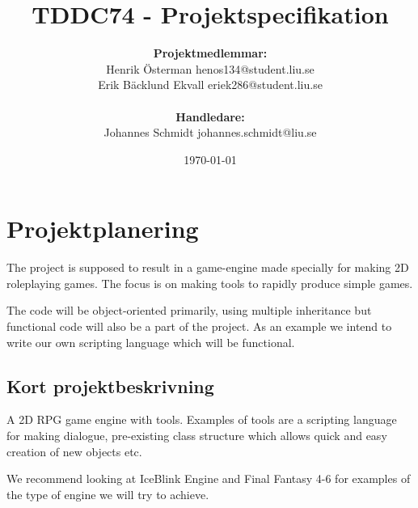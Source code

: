 \documentclass[12pt,a4paper]{article}
\title{TDDC74 -  Projektspecifikation}
\author{\textbf{Projektmedlemmar:}\\
Henrik Österman \small{henos134@student.liu.se}\\
Erik Bäcklund Ekvall \small{eriek286@student.liu.se}\\ 
\bigskip\\ \textbf{Handledare:}\\
Johannes Schmidt {\small johannes.schmidt@liu.se}}
\date{\today}
\begin{document}
\maketitle
\newpage

\tableofcontents
\newpage

\section{Projektplanering}

The project is supposed to result in a game-engine made specially for making 2D roleplaying games. 
The focus is on making tools to rapidly produce simple games.

The code will be object-oriented primarily, using multiple inheritance but functional code will also be a part of the project. As an example we intend to write our own scripting language which will be functional.


\subsection{Kort projektbeskrivning}

A 2D RPG game engine with tools.
Examples of tools are a scripting language for making dialogue, pre-existing class structure which allows quick and easy creation of new objects etc.

We recommend looking at IceBlink Engine and Final Fantasy 4-6 for examples of the type of engine we will try to achieve.

\end{document}
